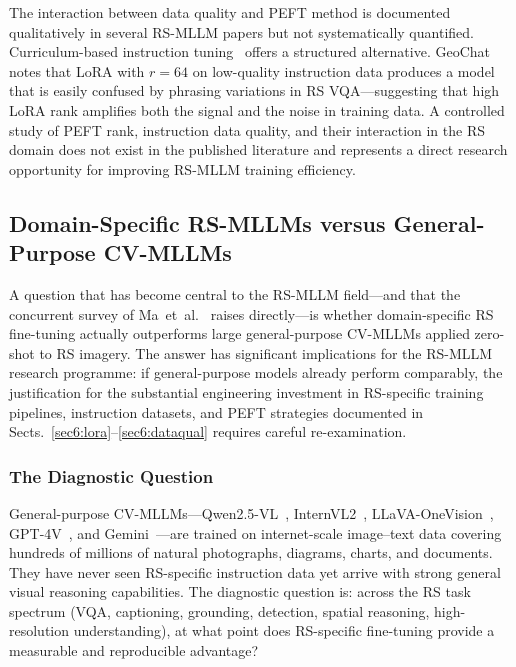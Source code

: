 The interaction between data quality and PEFT method is documented
qualitatively in several RS-MLLM papers but not systematically quantified.
Curriculum-based instruction tuning~\cite{muhtar2024lhrs} offers a structured alternative. GeoChat~\cite{geochat2024} notes that LoRA with $r\!=\!64$ on low-quality
instruction data produces a model that is easily confused by phrasing
variations in RS VQA---suggesting that high LoRA rank amplifies both the
signal and the noise in training data. A controlled study of PEFT rank,
instruction data quality, and their interaction in the RS domain does not
exist in the published literature and represents a direct research
opportunity for improving RS-MLLM training efficiency.

\subsection{Domain-Specific RS-MLLMs versus General-Purpose CV-MLLMs}%
\label{sec6:cvmllm}

A question that has become central to the RS-MLLM field---and that the concurrent
survey of Ma~et~al.~\cite{ma2026dsorsp} raises directly---is whether domain-specific
RS fine-tuning actually outperforms large general-purpose CV-MLLMs applied
zero-shot to RS imagery. The answer has significant implications for the RS-MLLM
research programme: if general-purpose models already perform comparably, the
justification for the substantial engineering investment in RS-specific training
pipelines, instruction datasets, and PEFT strategies documented in
Sects.~\ref{sec6:lora}--\ref{sec6:dataqual} requires careful re-examination.

\subsubsection{The Diagnostic Question}\label{sec6:cvmllm_q}

General-purpose CV-MLLMs---Qwen2.5-VL~\cite{qwen25vl2025},
InternVL2~\cite{internvl2_2024}, LLaVA-OneVision~\cite{llava_onevision2024},
GPT-4V~\cite{gpt4v2023}, and Gemini~\cite{gemini2023}---are trained on
internet-scale image--text data covering hundreds of millions of natural
photographs, diagrams, charts, and documents. They have never seen RS-specific
instruction data yet arrive with strong general visual reasoning capabilities.
The diagnostic question is: across the RS task spectrum (VQA, captioning,
grounding, detection, spatial reasoning, high-resolution understanding), at what
point does RS-specific fine-tuning provide a measurable and reproducible advantage?

